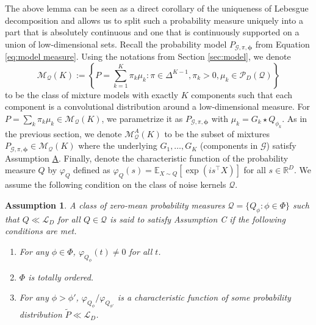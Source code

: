 \documentclass[bj,authoryear]{imsart}
\theoremstyle{plain}
\newtheorem{assumption}{Assumption}
\theoremstyle{remark}
\def\bphi{{\boldsymbol\phi}}
\def\bbE{\mathbb{E}}
\def\bbR{\mathbb{R}}
\def\cG{\mathcal{G}}
\def\cL{\mathcal{L}}
\def\cM{\mathcal{M}}
\def\cP{\mathcal{P}}
\def\cQ{\mathcal{Q}}
\begin{document}
The above lemma can be seen as a direct corollary of the uniqueness of Lebesgue decomposition and allows us to split such a probability measure uniquely into a part that is absolutely continuous and one that is continuously supported on a union of low-dimensional sets. Recall the probability model $P_{\cG,\pi,\bphi}$ from Equation \eqref{eq:model measure}. Using the notations from Section \ref{sec:model}, we denote
$$\cM_{\cQ}(K):=\left\{P=\sum_{k=1}^K \pi_k \mu_k: \pi\in\Delta^{K-1}, \pi_k>0, \mu_k\in \cP_D(\cQ)\right\}$$
to be the class of mixture models with exactly $K$ components such that each component is a convolutional distribution around a low-dimensional measure. For $P=\sum_k\pi_k\mu_k\in \cM_\cQ(K)$, we parametrize it as $P_{\cG,\pi,\bphi}$ with $\mu_k=G_k\star Q_{\phi_k}$. As in the previous section, we denote $\cM^A_{\cQ}(K)$ to be the subset of mixtures $P_{\cG,\pi,\bphi}\in \cM_{\cQ}(K)$ where the underlying $G_1,\dots,G_K$ (components in $\cG$) satisfy Assumption \hyperref[assume:A]{A}. Finally, denote the characteristic function of the probability measure $Q$ by $\varphi_Q$ defined as $\varphi_Q(s)=\bbE_{X\sim Q}[\exp(is^\top X)]$ for all $s\in\bbR^D$. We assume the following condition on the class of noise kernels $\cQ$.

\begin{assumption}\label{assume:C}
    A class of zero-mean probability measures $\cQ=\{Q_{\phi}:\phi\in \Phi\}$ such that $Q\ll \cL_D$ for all $Q\in \cQ$ is said to satisfy Assumption C if the following conditions are met.
    \begin{enumerate}
        \item For any $\phi\in\Phi$, $\varphi_{Q_\phi}(t)\neq 0$ for all $t$.
        \item $\Phi$ is totally ordered.
        \item For any $\phi>\phi'$, $\varphi_{Q_\phi}/\varphi_{Q_{\phi'}}$ is a characteristic function of some probability distribution $\tilde{P}\ll \cL_D$.
    \end{enumerate}
\end{assumption}
\end{document}
